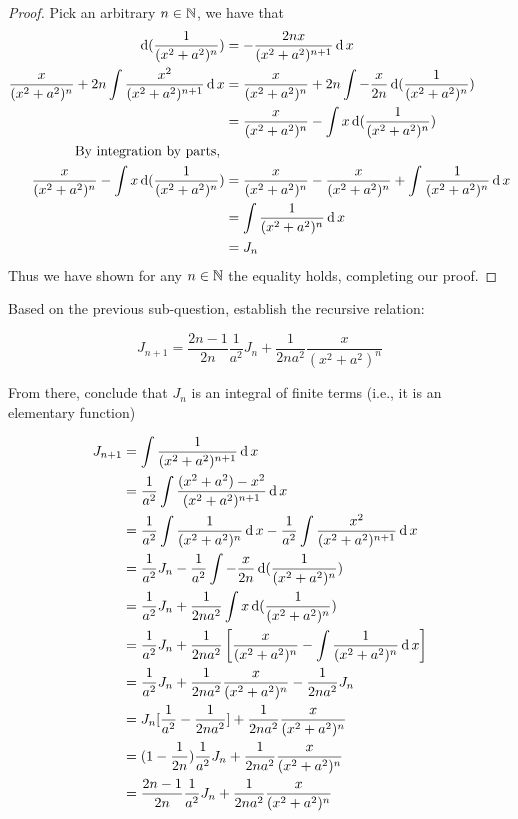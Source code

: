 \documentclass{homework}
\newcommand{\N}{\bb{N}} %
\newcommand{\?}{\stackrel{?}{=}}
\theoremstyle{definition}
\begin{document}
\begin{proof}
    Pick an arbitrary $n\in\N$, we have that
    \begin{align*}
    \operatorname{d} (\frac{1}{(x^2+a^2)^{n}}) &= -\frac{2nx}{(x^2+a^2)^{n+1}}\operatorname{d} x\\
        \frac{x}{(x^2+a^2)^{n}}+2n\int \frac{x^2}{(x^2+a^2)^{n+1}}\operatorname{d} x &= \frac{x}{(x^2+a^2)^{n}}+2n\int -\frac{x}{2n}\operatorname{d} (\frac{1}{(x^2+a^2)^{n}})\\
        &=\frac{x}{(x^2+a^2)^{n}}-\int x\operatorname{d} (\frac{1}{(x^2+a^2)^{n}})\\
        \text{By integration by parts, }\\
        \frac{x}{(x^2+a^2)^{n}}-\int x\operatorname{d} (\frac{1}{(x^2+a^2)^{n}}) &= \frac{x}{(x^2+a^2)^{n}} - \frac{x}{(x^2+a^2)^{n}} + \int \frac{1}{(x^2+a^2)^{n}}\operatorname{d} x\\
        &= \int \frac{1}{(x^2+a^2)^{n}}\operatorname{d} x\\
        &= J_n
    \end{align*}
    Thus we have shown for any $n\in\N$ the equality holds, completing our proof.
\end{proof}

\newpage

\question Based on the previous sub-question, establish the recursive relation:

$$
J_{n+1}=\frac{2 n-1}{2 n} \frac{1}{a^{2}} J_{n}+\frac{1}{2 n a^{2}} \frac{x}{\left(x^{2}+a^{2}\right)^{n}}
$$

From there, conclude that $J_{n}$ is an integral of finite terms (i.e., it is an elementary function) 

\begin{align*}
    J_{n+1}&=\int \frac{1}{(x^2+a^2)^{n+1}}\operatorname{d} x\\
    &= \frac1{a^2}\int \frac{(x^2+a^2)-x^2}{(x^2+a^2)^{n+1}}\operatorname{d} x\\
    &=\frac1{a^2}\int\frac1{(x^2+a^2)^n}\operatorname{d} x - \frac1{a^2}\int\frac{x^2}{(x^2+a^2)^{n+1}}\operatorname{d} x\\
    &=\frac1{a^2}J_n - \frac1{a^2}\int -\frac{x}{2n}\operatorname{d} (\frac{1}{(x^2+a^2)^n})\\
    &=\frac1{a^2}J_n + \frac1{2na^2}\int x\operatorname{d} (\frac{1}{(x^2+a^2)^n})\\
    &=\frac1{a^2}J_n + \frac{1}{2na^2}\left[\frac{x}{(x^2+a^2)^n}-\int\frac1{(x^2+a^2)^n}\operatorname{d} x \right]\\
    &=\frac1{a^2}J_n + \frac1{2na^2}\frac{x}{(x^2+a^2)^n}-\frac{1}{2na^2}J_n\\
    &=J_n[\frac{1}{a^2}-\frac{1}{2na^2}]+\frac{1}{2na^2}\frac{x}{(x^2+a^2)^n}\\
    &=(1-\frac1{2n})\frac1{a^2}J_n + \frac1{2na^2}\frac{x}{(x^2+a^2)^n}\\
    &=\frac{2n-1}{2n}\frac1{a^2}J_n + \frac1{2na^2}\frac{x}{(x^2+a^2)^n}
\end{align*}
\end{document}
